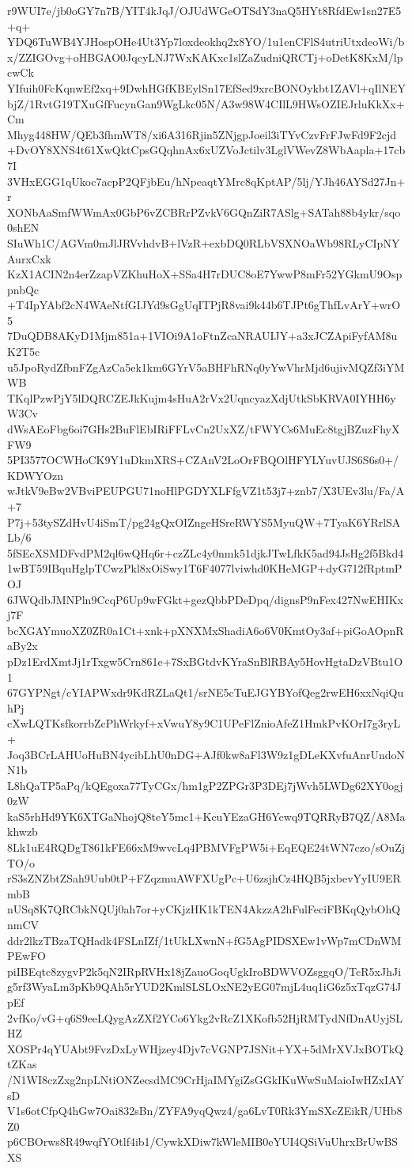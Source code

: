 r9WUI7e/jb0oGY7n7B/YIT4kJqJ/OJUdWGeOTSdY3naQ5HYt8RfdEw1sn27E5+q+
YDQ6TuWB4YJHospOHe4Ut3Yp7loxdeokhq2x8YO/1u1enCFlS4utriUtxdeoWi/b
x/ZZIGOvg+oHBGAO0JqcyLNJ7WxKAKxc1slZaZudniQRCTj+oDetK8KxM/lpcwCk
YIfuih0FcKqnwEf2xq+9DwhHGfKBEylSn17EfSed9xrcBONOykbt1ZAVl+qIlNEY
bjZ/1RvtG19TXuGfFucynGan9WgLkc05N/A3w98W4CIlL9HWsOZIEJrluKkXx+Cm
Mhyg448HW/QEb3fhmWT8/xi6A316Rjin5ZNjgpJoeil3iTYvCzvFrFJwFd9F2cjd
+DvOY8XNS4t61XwQktCpsGQqhnAx6xUZVoJctilv3LglVWevZ8WbAapla+17cb7I
3VHxEGG1qUkoc7acpP2QFjbEu/hNpeaqtYMrc8qKptAP/5lj/YJh46AYSd27Jn+r
XONbAaSmfWWmAx0GbP6vZCBRrPZvkV6GQnZiR7ASlg+SATah88b4ykr/sqo0shEN
SIuWh1C/AGVm0mJlJRVvhdvB+lVzR+exbDQ0RLbVSXNOaWb98RLyCIpNYAurxCxk
KzX1ACIN2n4erZzapVZKhuHoX+SSa4H7rDUC8oE7YwwP8mFr52YGkmU9OsppnbQc
+T4IpYAbf2cN4WAeNtfGIJYd9sGgUqITPjR8vai9k44b6TJPt6gThfLvArY+wrO5
7DuQDB8AKyD1Mjm851a+1VIOi9A1oFtnZcaNRAUIJY+a3xJCZApiFyfAM8uK2T5c
u5JpoRydZfbnFZgAzCa5ek1km6GYrV5aBHFhRNq0yYwVhrMjd6ujivMQZf3iYMWB
TKqlPzwPjY5lDQRCZEJkKujm4sHuA2rVx2UqncyazXdjUtkSbKRVA0IYHH6yW3Cv
dWsAEoFbg6oi7GHs2BuFlEbIRiFFLvCn2UxXZ/tFWYCs6MuEc8tgjBZuzFhyXFW9
5PI3577OCWHoCK9Y1uDkmXRS+CZAnV2LoOrFBQOlHFYLYuvUJS6S6s0+/KDWYOzn
wJtkV9eBw2VBviPEUPGU71noHlPGDYXLFfgVZ1t53j7+znb7/X3UEv3lu/Fa/A+7
P7j+53tySZdHvU4iSmT/pg24gQxOIZngeHSreRWYS5MyuQW+7TyaK6YRrlSALb/6
5fSEcXSMDFvdPM2ql6wQHq6r+czZLc4y0nmk51djkJTwLfkK5ad94JsHg2f5Bkd4
1wBT59IBquHglpTCwzPkl8xOiSwy1T6F4077lviwhd0KHeMGP+dyG712fRptmPOJ
6JWQdbJMNPln9CcqP6Up9wFGkt+gezQbbPDeDpq/dignsP9nFex427NwEHIKxj7F
bcXGAYmuoXZ0ZR0a1Ct+xnk+pXNXMxShadiA6o6V0KmtOy3af+piGoAOpnRaBy2x
pDz1ErdXmtJj1rTxgw5Crn861e+7SxBGtdvKYraSnBlRBAy5HovHgtaDzVBtu1O1
67GYPNgt/cYIAPWxdr9KdRZLaQt1/srNE5cTuEJGYBYofQeg2rwEH6xxNqiQuhPj
cXwLQTKsfkorrbZcPhWrkyf+xVwuY8y9C1UPeFlZnioAfeZ1HmkPvKOrI7g3ryL+
Joq3BCrLAHUoHuBN4ycibLhU0nDG+AJf0kw8aFl3W9z1gDLeKXvfuAnrUndoNN1b
L8hQaTP5aPq/kQEgoxa77TyCGx/hm1gP2ZPGr3P3DEj7jWvh5LWDg62XY0ogj0zW
kaS5rhHd9YK6XTGaNhojQ8teY5mc1+KcuYEzaGH6Ycwq9TQRRyB7QZ/A8Makhwzb
8Lk1uE4RQDgT861kFE66xM9wvcLq4PBMVFgPW5i+EqEQE24tWN7czo/sOuZjTO/o
rS3sZNZbtZSah9Uub0tP+FZqzmuAWFXUgPc+U6zsjhCz4HQB5jxbevYyIU9ERmbB
nUSq8K7QRCbkNQUj0ah7or+yCKjzHK1kTEN4AkzzA2hFulFeciFBKqQybOhQnmCV
ddr2lkzTBzaTQHadk4FSLnIZf/1tUkLXwnN+fG5AgPIDSXEw1vWp7mCDnWMPEwFO
piIBEqtc8zygvP2k5qN2IRpRVHx18jZauoGoqUgkIroBDWVOZsggqO/TcR5xJhJi
g5rf3WyaLm3pKb9QAh5rYUD2KmlSLSLOxNE2yEG07mjL4uq1iG6z5xTqzG74JpEf
2vfKo/vG+q6S9eeLQygAzZXf2YCo6Ykg2vRcZ1XKofb52HjRMTydNfDnAUyjSLHZ
XOSPr4qYUAbt9FvzDxLyWHjzey4Djv7cVGNP7JSNit+YX+5dMrXVJxBOTkQtZKas
/N1WI8czZxg2npLNtiONZecsdMC9CrHjaIMYgiZsGGkIKuWwSuMaioIwHZxIAYsD
V1s6otCfpQ4hGw7Oai832sBn/ZYFA9yqQwz4/ga6LvT0Rk3YmSXcZEikR/UHb8Z0
p6CBOrws8R49wqfYOtlf4ib1/CywkXDiw7kWleMIB0eYUI4QSiVuUhrxBrUwBSXS

